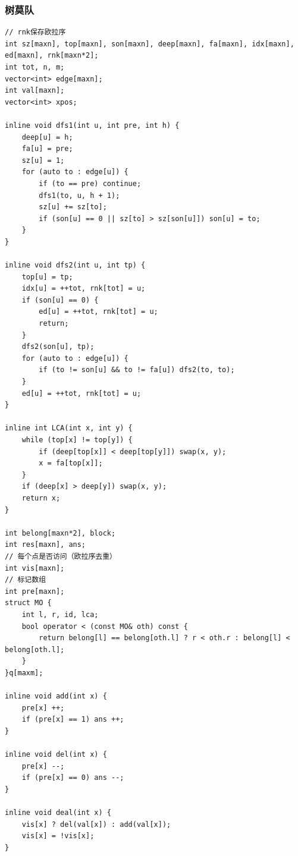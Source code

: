 \documentclass[twoside]{article}
\begin{document}
\subsubsection{树莫队}
\begin{lstlisting}
// rnk保存欧拉序
int sz[maxn], top[maxn], son[maxn], deep[maxn], fa[maxn], idx[maxn], ed[maxn], rnk[maxn*2];
int tot, n, m;
vector<int> edge[maxn];
int val[maxn];
vector<int> xpos;

inline void dfs1(int u, int pre, int h) {
    deep[u] = h;
    fa[u] = pre;
    sz[u] = 1;
    for (auto to : edge[u]) {
        if (to == pre) continue;
        dfs1(to, u, h + 1);
        sz[u] += sz[to];
        if (son[u] == 0 || sz[to] > sz[son[u]]) son[u] = to;
    }
}

inline void dfs2(int u, int tp) {
    top[u] = tp;
    idx[u] = ++tot, rnk[tot] = u;
    if (son[u] == 0) {
        ed[u] = ++tot, rnk[tot] = u;
        return;
    }
    dfs2(son[u], tp);
    for (auto to : edge[u]) {
        if (to != son[u] && to != fa[u]) dfs2(to, to);
    }
    ed[u] = ++tot, rnk[tot] = u;
}

inline int LCA(int x, int y) {
    while (top[x] != top[y]) {
        if (deep[top[x]] < deep[top[y]]) swap(x, y);
        x = fa[top[x]];
    }
    if (deep[x] > deep[y]) swap(x, y);
    return x;
}

int belong[maxn*2], block;
int res[maxn], ans;
// 每个点是否访问（欧拉序去重）
int vis[maxn];
// 标记数组
int pre[maxn];
struct MO {
    int l, r, id, lca;
    bool operator < (const MO& oth) const {
        return belong[l] == belong[oth.l] ? r < oth.r : belong[l] < belong[oth.l];
    }
}q[maxm];

inline void add(int x) {
    pre[x] ++;
    if (pre[x] == 1) ans ++;
}

inline void del(int x) {
    pre[x] --;
    if (pre[x] == 0) ans --;
}

inline void deal(int x) {
    vis[x] ? del(val[x]) : add(val[x]);
    vis[x] = !vis[x];
}


\end{lstlisting}
\end{document}
